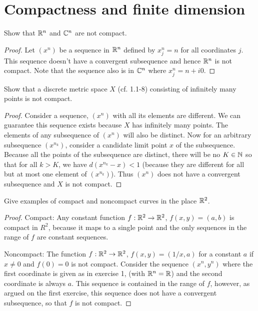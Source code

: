 \section{Compactness and finite dimension}


\begin{exercise}{1}
Show that $\mathbb{R}^n$ and $\mathbb{C}^n$ are not compact.
\end{exercise}
\begin{proof}
Let $(x^n)$ be a sequence in $\mathbb{R}^n$ defined by $x^n_j=n$ for all coordinates $j$. This sequence doesn't have a convergent subsequence and hence $\mathbb{R}^n$ is not compact. Note that the sequence also is in $\mathbb{C}^n$ where $x^n_j=n+i0$.
\end{proof}

\begin{exercise}{2}
Show that a discrete metric space $X$ (cf. 1.1-8) consisting of infinitely many points is not compact.
\end{exercise}
\begin{proof}
Consider a sequence, $(x^n)$ with all its elements are different. We can guarantee this sequence exists because $X$ has infinitely many points. The elements of any subsequence of $(x^n)$  will also be distinct. Now for an arbitrary subsequence $(x^{n_k})$, consider a candidate limit point $x$ of the subsequence. Because all the points of the subsequence are distinct, there will be no $K\in\mathbb{N}$ so that for all $k>K$, we have $d(x^{n_k}-x)<1$ (because they are different for all but at most one element of $(x^{n_k})$). Thus $(x^n)$ does not have a convergent subsequence and $X$ is not compact.
\end{proof}

\begin{exercise}{3}
Give examples of compact and noncompact curves in the place $\mathbb{R}^2$.
\end{exercise}
\begin{proof}
Compact: Any constant function $f:\mathbb{R}^2\to\mathbb{R}^2$, $f(x,y)=(a,b)$ is compact in $R^2$, because it maps to a single point and the only sequences in the range of $f$ are constant sequences.

Noncompact: The function $f:\mathbb{R}^2\to\mathbb{R}^2$, $f(x,y)=(1/x,a)$ for a constant $a$ if $x\neq 0$ and $f(0)=0$ is not compact. Consider the sequence $(x^n,y^n)$ where the first coordinate is given as in exercise 1, (with $\mathbb{R}^n=\mathbb{R}$) and the second coordinate is always $a$. This sequence is contained in the range of $f$, however, as argued on the first exercise, this sequence does not have a convergent subsequence, so that $f$ is not compact.
\end{proof}

